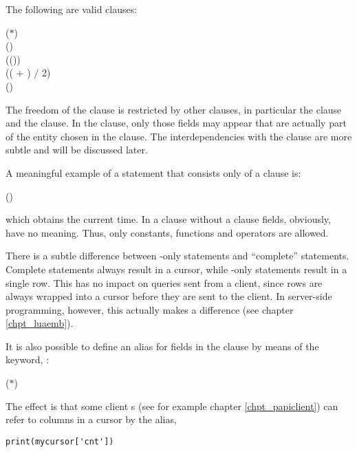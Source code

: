 The following are valid  clauses:

 ($\ast$) \\
 () \\
 (()) \\
 (( $+$
                                   ) $/$ 2) \\
 ()

The freedom of the  clause
is restricted by other clauses, in particular
the  clause and the  clause.
In the  clause, only
those fields may appear that are actually
part of the entity chosen in the  clause.
The interdependencies with the  clause
are more subtle and will be discussed later.

A meaningful example of a  statement
that consists only of a  clause is:

 ()

which obtains the current time.
In a  clause without a  clause
fields, obviously, have no meaning.
Thus, only constants, functions
and operators are allowed.

There is a subtle difference between -only
statements and ``complete''  statements.
Complete  statements always result in a
cursor, while -only statements result
in a single row. This has no impact on queries sent
from a client, since rows are always wrapped into
a cursor before they are sent to the client.
In server-side programming, however,
this actually makes a difference
(see chapter \ref{chpt_luaemb}).

It is also possible to define an alias for fields
in the  clause by means of
the  keyword, \eg:

 ($\ast$)  

The effect is that some client s
(see for example chapter \ref{chpt_papiclient})
can refer to columns in a cursor by the alias,
\eg\

\begin{python}
\begin{lstlisting}
print(mycursor['cnt'])
\end{lstlisting}
\end{python}

